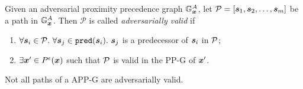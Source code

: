 \begin{definition}
\label{def:adversarially-valid-path}
Given an adversarial proximity precedence graph $\APPG$, let $\vpath = [\sample[1], \sample[2],\ldots, \sample[m]]$ be a path in $\APPG$. Then  $\mathcal{P}$ is called \emph{adversarially valid} if
\begin{enumerate}
  \item $\forall \sample[i] \in \mathcal{P}.\ \forall \sample[j] \in \pred{\sample[i]}.\ \sample[j]$ is a predecessor of $\sample[i]$ in $\vpath$;
  \item $\exists \x[]' \in \pert$ such that $\vpath$ is valid in the \acs{PP-G} of $\x[]'$.
\end{enumerate}
\end{definition}
\begin{proposition}
\label{prop:invalid-path-in-appg}
Not all paths of a \acs{APP-G} are adversarially valid.
\end{proposition}
